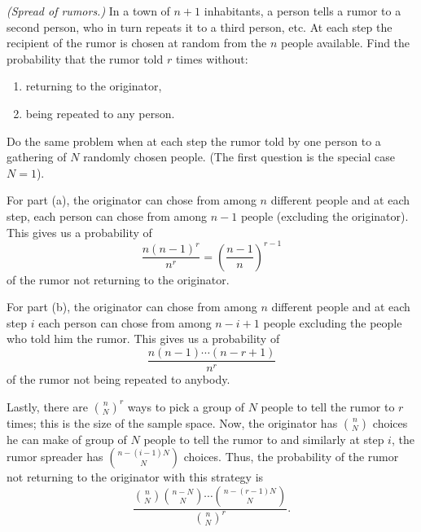 \begin{problem}[Handout 2, \# 13]
  \emph{(Spread of rumors.)} In a town of \(n+1\) inhabitants, a person tells
  a rumor to a second person, who in turn repeats it to a third person,
  etc. At each step the recipient of the rumor is chosen at random from the
  \(n\) people available. Find the probability that the rumor told \(r\)
  times without:
  \begin{enumerate}[label=(\alph*),noitemsep]
  \item returning to the originator,
  \item being repeated to any person.
  \end{enumerate}
  Do the same problem when at each step the rumor told by one person to a
  gathering of \(N\) randomly chosen people. (The first question is the
  special case \(N=1\)).
\end{problem}
\begin{solution}
  For part (a), the originator can chose from among \(n\) different people
  and at each step, each person can chose from among \(n-1\) people
  (excluding the originator). This gives us a probability of
  \[
    \frac{n(n-1)^r}{n^r}=\left(\frac{n-1}{n}\right)^{r-1}
  \]
  of the rumor not returning to the originator.

  For part (b), the originator can chose from among \(n\) different people
  and at each step \(i\) each person can chose from among \(n-i+1\) people
  excluding the people who told him the rumor. This gives us a probability
  of
  \[
    \frac{n(n-1)\dotsm(n-r+1)}{n^r}
  \]
  of the rumor not being repeated to anybody.

  Lastly, there are \(\displaystyle\binom{n}{N}^r\) ways to pick a group of
  \(N\) people to tell the rumor to \(r\) times; this is the size of the
  sample space. Now, the originator has \(\displaystyle\binom{n}{N}\)
  choices he can make of group of \(N\) people to tell the rumor to and
  similarly at step \(i\), the rumor spreader has
  \(\displaystyle\binom{n-(i-1)N}{N}\) choices. Thus, the probability of
  the rumor not returning to the originator with this strategy is
  \[
    \frac{\displaystyle\binom{n}{N}\binom{n-N}{N}\dotsm\binom{n-(r-1)N}{N}}
    {\displaystyle\binom{n}{N}^r}.
  \]
\end{solution}
\newpage

